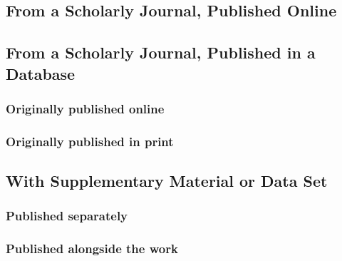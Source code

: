 \documentclass{article}
\begin{document}
\subsection{From a Scholarly Journal, Published Online} %
\label{sub:from_a_scholarly_journal_published_online}
\begin{refsection}
	\printbibliography[heading=none]
\end{refsection}
\subsection{From a Scholarly Journal, Published in a Database} %
\label{sub:from_a_scholarly_journal_published_in_a_database}
\subsubsection{Originally published online} %
\label{ssub:originally_published_online}
\begin{refsection}
	\printbibliography[heading=none]
\end{refsection}
\subsubsection{Originally published in print} %
\label{ssub:originally_published_in_print}
\begin{refsection}
	\printbibliography[heading=none]
\end{refsection}
\subsection{With Supplementary Material or Data Set} %
\label{sub:with_supplementary_material_or_data_set}
\subsubsection{Published separately} %
\label{ssub:published_separately}
\begin{refsection}
	\printbibliography[heading=none]
\end{refsection}
\subsubsection{Published alongside the work} %
\label{ssub:published_alongside_the_work}
\begin{refsection}
	\printbibliography[heading=none]
\end{refsection}
\end{document}
